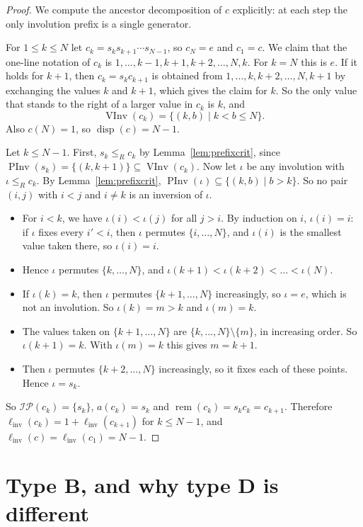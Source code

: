 \documentclass[11pt]{amsart}
\theoremstyle{definition}
\theoremstyle{remark}
\numberwithin{equation}{section}
\newcommand{\linv}{\ell_{\mathrm{inv}}}
\newcommand{\IP}{\mathcal{IP}}
\newcommand{\leR}{\le_R}
\DeclareMathOperator{\rem}{rem}
\DeclareMathOperator{\disp}{disp}
\DeclareMathOperator{\PInv}{PInv}
\DeclareMathOperator{\VInv}{VInv}
\begin{document}
\begin{proof}
We compute the ancestor decomposition of \(c\) explicitly: at each step the only involution prefix is a single generator.

For \(1\le k\le N\) let \(c_k=s_ks_{k+1}\cdots s_{N-1}\), so \(c_N=e\) and \(c_1=c\). We claim that the one-line notation of \(c_k\) is \(1,\dots,k-1,k+1,k+2,\dots,N,k\). For \(k=N\) this is \(e\). If it holds for \(k+1\), then \(c_k=s_kc_{k+1}\) is obtained from \(1,\dots,k,k+2,\dots,N,k+1\) by exchanging the values \(k\) and \(k+1\), which gives the claim for \(k\). So the only value that stands to the right of a larger value in \(c_k\) is \(k\), and
\[
\VInv(c_k)=\{(k,b)\mid k<b\le N\}.
\]
Also \(c(N)=1\), so \(\disp(c)=N-1\).

Let \(k\le N-1\). First, \(s_k\leR c_k\) by Lemma~\ref{lem:prefixcrit}, since \(\PInv(s_k)=\{(k,k+1)\}\subseteq\VInv(c_k)\). Now let \(\iota\) be any involution with \(\iota\leR c_k\). By Lemma~\ref{lem:prefixcrit}, \(\PInv(\iota)\subseteq\{(k,b)\mid b>k\}\). So no pair \((i,j)\) with \(i<j\) and \(i\neq k\) is an inversion of \(\iota\).
\begin{itemize}
\item For \(i<k\), we have \(\iota(i)<\iota(j)\) for all \(j>i\). By induction on \(i\), \(\iota(i)=i\): if \(\iota\) fixes every \(i'<i\), then \(\iota\) permutes \(\{i,\dots,N\}\), and \(\iota(i)\) is the smallest value taken there, so \(\iota(i)=i\).
\item Hence \(\iota\) permutes \(\{k,\dots,N\}\), and \(\iota(k+1)<\iota(k+2)<\dots<\iota(N)\).
\item If \(\iota(k)=k\), then \(\iota\) permutes \(\{k+1,\dots,N\}\) increasingly, so \(\iota=e\), which is not an involution. So \(\iota(k)=m>k\) and \(\iota(m)=k\).
\item The values taken on \(\{k+1,\dots,N\}\) are \(\{k,\dots,N\}\setminus\{m\}\), in increasing order. So \(\iota(k+1)=k\). With \(\iota(m)=k\) this gives \(m=k+1\).
\item Then \(\iota\) permutes \(\{k+2,\dots,N\}\) increasingly, so it fixes each of these points. Hence \(\iota=s_k\).
\end{itemize}
So \(\IP(c_k)=\{s_k\}\), \(a(c_k)=s_k\) and \(\rem(c_k)=s_kc_k=c_{k+1}\). Therefore \(\linv(c_k)=1+\linv(c_{k+1})\) for \(k\le N-1\), and \(\linv(c)=\linv(c_1)=N-1\).
\end{proof}

\section{Type B, and why type D is different}\label{sec:typeB}
\end{document}
